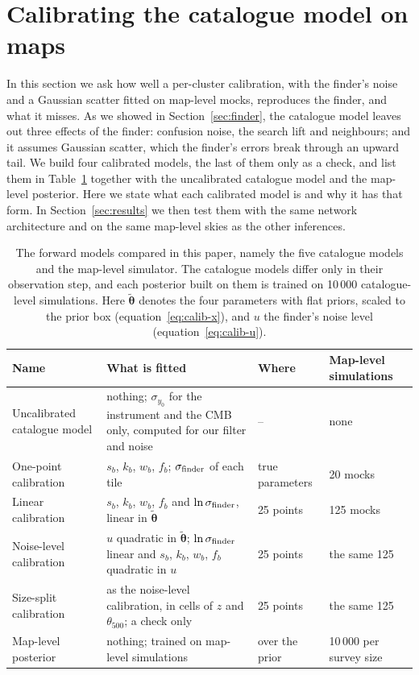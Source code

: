 \section{Calibrating the catalogue model on maps}\label{sec:calibration}

In this section we ask how well a per-cluster calibration, with the finder's noise and a Gaussian scatter fitted on map-level mocks, reproduces
the finder, and what it misses. As we showed in Section~\ref{sec:finder}, the catalogue model leaves out three
effects of the finder: confusion noise, the search lift and neighbours; and it assumes Gaussian scatter, which
the finder's errors break through an upward tail. We build four calibrated models, the last of them only as a
check, and list them in Table~\ref{tab:models} together with the uncalibrated catalogue model and the
map-level posterior. Here we state what each calibrated model is and why it has that form. In Section~\ref{sec:results} we then test them with the same network architecture and on the same map-level skies as
the other inferences.

\begin{table}
\centering
\small
\caption{The forward models compared in this paper, namely the five catalogue models and the map-level
simulator. The catalogue models differ only in their observation step, and each posterior built on them is
trained on 10\,000 catalogue-level simulations. Here $\tilde{\bm\theta}$ denotes the four parameters with flat
priors, scaled to the prior box (equation~\ref{eq:calib-x}), and $u$ the finder's noise level
(equation~\ref{eq:calib-u}).}
\label{tab:models}
\begin{tabular}{@{}lp{}ll@{}}
\toprule
Name & What is fitted & Where & Map-level simulations \\
\midrule
Uncalibrated catalogue model & nothing; $\sigma_{y_0}$ for the instrument and the CMB only, computed for our filter and noise & -- & none \\
One-point calibration & $s_b$, $k_b$, $w_b$, $f_b$; $\sigma_\mathrm{finder}$ of each tile & true parameters & 20 mocks \\
Linear calibration & $s_b$, $k_b$, $w_b$, $f_b$ and $\ln\sigma_\mathrm{finder}$, linear in $\tilde{\bm\theta}$ & 25 points & 125 mocks \\
Noise-level calibration & $u$ quadratic in $\tilde{\bm\theta}$; $\ln\sigma_\mathrm{finder}$ linear and $s_b$, $k_b$,
$w_b$, $f_b$ quadratic in $u$ & 25 points & the same 125 \\
Size-split calibration & as the noise-level calibration, in cells of $z$ and $\theta_{500}$; a check only & 25 points & the same 125 \\
Map-level posterior & nothing; trained on map-level simulations & over the prior & 10\,000 per survey size \\
\bottomrule
\end{tabular}
\end{table}

